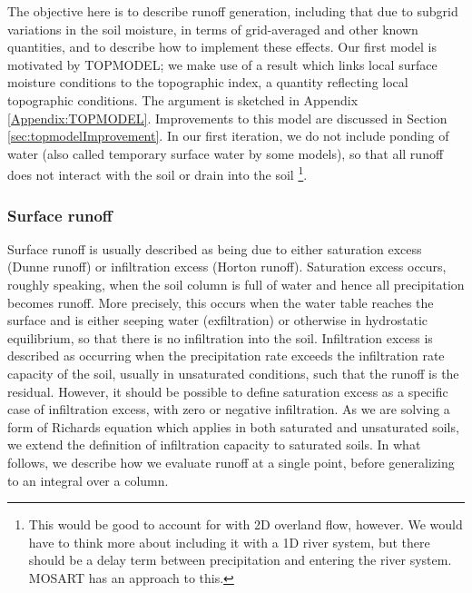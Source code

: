 \documentclass[twoside,10pt]{report}
\begin{document}



The objective here is to describe runoff generation, including that due to subgrid variations in the soil moisture, in terms of grid-averaged and other known quantities, and to describe how to implement these effects. Our first model is motivated by TOPMODEL; we make use of a result which links local surface moisture conditions to the topographic index, a quantity reflecting local topographic conditions. The argument is sketched in Appendix \ref{Appendix:TOPMODEL}. Improvements to this model are discussed in Section \ref{sec:topmodelImprovement}.  In our first iteration, we do not include ponding of water (also called temporary surface water by some models), so that all runoff does not interact with the soil or drain into the soil \footnote{This would be good to account for with 2D overland flow, however. We would have to think more about including it with a 1D river system, but there should be a delay term between precipitation and entering the river system. MOSART has an approach to this.}.

\subsubsection{Surface runoff}
Surface runoff is usually described as being due to either saturation excess (Dunne runoff) or infiltration excess (Horton runoff). Saturation excess occurs, roughly speaking, when the soil column is full of water and hence all precipitation  becomes runoff. More precisely, this occurs when the water table reaches the surface and is either seeping water (exfiltration) or otherwise in hydrostatic equilibrium, so that there is no infiltration into the soil. Infiltration excess is described as occurring when the precipitation rate exceeds the infiltration rate capacity of the soil, usually in unsaturated conditions, such that the runoff is the residual. However, it should be possible to define saturation excess as a specific case of infiltration excess, with zero or negative infiltration. As we are solving a form of Richards equation which applies in both saturated and unsaturated soils, we extend the definition of infiltration capacity to saturated soils.  In what follows, we describe how we evaluate runoff at a single point, before generalizing to an integral over a column.
\end{document}
